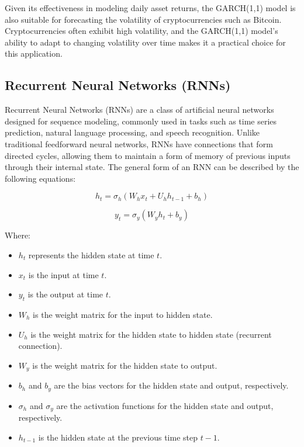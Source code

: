 \documentclass{ieeeojies}
\begin{document}
Given its effectiveness in modeling daily asset returns, the GARCH(1,1) model is also suitable for forecasting the volatility of cryptocurrencies such as Bitcoin. Cryptocurrencies often exhibit high volatility, and the GARCH(1,1) model's ability to adapt to changing volatility over time makes it a practical choice for this application.

\subsection{Recurrent Neural Networks (RNNs)}
Recurrent Neural Networks (RNNs) are a class of artificial neural networks designed for sequence modeling, commonly used in tasks such as time series prediction, natural language processing, and speech recognition. Unlike traditional feedforward neural networks, RNNs have connections that form directed cycles, allowing them to maintain a form of memory of previous inputs through their internal state. The general form of an RNN can be described by the following equations:

\[
  h_t = \sigma_h(W_h x_t + U_h h_{t-1} + b_h)
\]

\[
  y_t = \sigma_y(W_y h_t + b_y)
\]

Where:
\begin{itemize}
  \item \( h_t \) represents the hidden state at time \( t \).
  \item \( x_t \) is the input at time \( t \).
  \item \( y_t \) is the output at time \( t \).
  \item \( W_h \) is the weight matrix for the input to hidden state.
  \item \( U_h \) is the weight matrix for the hidden state to hidden state (recurrent connection).
  \item \( W_y \) is the weight matrix for the hidden state to output.
  \item \( b_h \) and \( b_y \) are the bias vectors for the hidden state and output, respectively.
  \item \( \sigma_h \) and \( \sigma_y \) are the activation functions for the hidden state and output, respectively.
  \item \( h_{t-1} \) is the hidden state at the previous time step \( t-1 \).
\end{itemize} \cite{b16,b18,b19}
\end{document}

